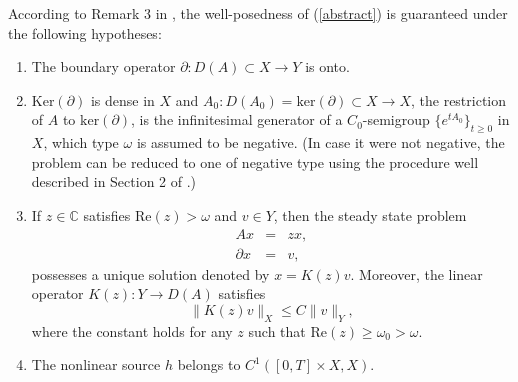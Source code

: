 \documentclass[a4paper,12pt]{article}
\begin{document}
According to Remark 3 in \cite{ACR}, the well-posedness of (\ref{abstract}) is guaranteed under the following hypotheses:

\begin{enumerate}
\item[(A1)] The boundary operator $\partial: D(A)\subset X \to Y$ is onto.

\item[(A2)] $\mbox{Ker}(\partial)$ is dense in $X$ and $A_0: D(A_0)= \mbox{ker}(\partial)\subset X \to X$, the restriction of $A$ to $\mbox{ker}(\partial)$, is the infinitesimal generator of a $C_0$-semigroup $\{ e^{t A_0} \}_{t \ge 0}$ in $X$, which type $\omega$ is assumed to be negative. (In case it were not negative, the problem can be reduced to one of negative type using the procedure well described in Section 2 of \cite{ACP}.)
\item[(A3)] If $z\in \mathbb{C}$ satisfies $\mbox{Re}(z)>\omega$ and $v\in Y$, then the steady state problem
\begin{eqnarray}
A x&=& z x, \nonumber \\
\partial x&=& v, \nonumber
\end{eqnarray}
possesses a unique solution denoted by $x=K(z)v$. Moreover, the linear operator $K(z):Y \to D(A)$ satisfies
$$
\|K(z) v\|_X \le C \|v\|_Y,$$
where the constant holds for any $z$ such that $\mbox{Re}(z) \ge \omega_0 > \omega$.
\item[(A4)] The nonlinear source $h$ belongs to $C^1([0,T]\times X, X)$.
\end{enumerate}
\end{document}
